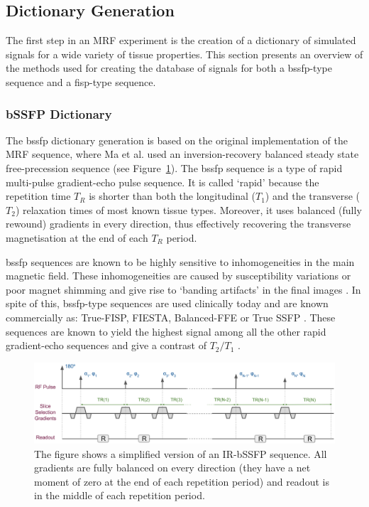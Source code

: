 \subsection{Dictionary Generation}
\label{method:dictionary}

The first step in an MRF experiment is the creation of a dictionary of simulated signals for a wide variety of tissue properties.
This section presents an overview of the methods used for creating the database of signals for both a \ac{bssfp}-type sequence and a \ac{fisp}-type sequence.

\hfill

\subsubsection{bSSFP Dictionary}

The \ac{bssfp} dictionary generation is based on the original implementation of the MRF sequence, where Ma et al. \cite{Ma2013} used an inversion-recovery balanced steady state free-precession sequence (see Figure~\ref{fig:sequencebSSFP}). 
The \ac{bssfp} sequence is a type of rapid multi-pulse gradient-echo pulse sequence. 
It is called `rapid' because the repetition time $T_R$ is shorter than both the longitudinal ($T_1$) and the transverse ($T_2$) relaxation times of most known tissue types.
Moreover, it uses balanced (fully rewound) gradients in every direction, thus effectively recovering the transverse magnetisation at the end of each $T_R$ period.

\hfill

\ac{bssfp} sequences are known to be highly sensitive to inhomogeneities in the main magnetic field. 
These inhomogeneities are caused by susceptibility variations or poor magnet shimming and give rise to `banding artifacts' in the final images \cite{Hargreaves2012}.
In spite of this, \ac{bssfp}-type sequences are used clinically today and are known commercially as: True-FISP, FIESTA, Balanced-FFE or True SSFP \cite{Hargreaves2012}.
These sequences are known to yield the highest signal among all the other rapid gradient-echo sequences and give a contrast of $T_2/T_1$ \cite{Scheffler2003}.

\begin{figure}[ht]
    \centering
    \includegraphics[angle=0,width=1\textwidth, keepaspectratio]{images/mrf/sequencebSSFP}
    \caption{The figure shows a simplified version of an IR-bSSFP sequence. 
    All gradients are fully balanced on every direction (they have a net moment of zero at the end of each repetition period) and readout is in the middle of each repetition period.}
    \label{fig:sequencebSSFP}
\end{figure}

